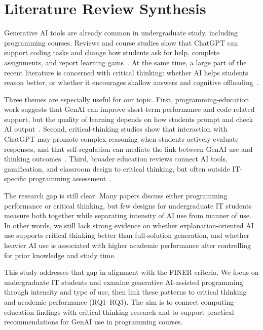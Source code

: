 \documentclass[11pt,a4paper]{article}
\begin{document}
\section{Literature Review Synthesis}

Generative AI tools are already common in undergraduate study, including programming courses. Reviews and course studies show that ChatGPT can support coding tasks and change how students ask for help, complete assignments, and report learning gains~\cite{chatgpt_baig_2026,impact_gambo_2026,explaining_denny_2024}. At the same time, a large part of the recent literature is concerned with critical thinking: whether AI helps students reason better, or whether it encourages shallow answers and cognitive offloading~\cite{critical_larson_2024,ai_gerlich_2025,artificial_zer_2025}.

Three themes are especially useful for our topic. First, programming-education work suggests that GenAI can improve short-term performance and code-related support, but the quality of learning depends on how students prompt and check AI output~\cite{chatgpt_baig_2026,impact_gambo_2026,explaining_denny_2024}. Second, critical-thinking studies show that interaction with ChatGPT may promote complex reasoning when students actively evaluate responses, and that self-regulation can mediate the link between GenAI use and thinking outcomes~\cite{student_suriano_2024,mediating_zhou_2024,prompts_yang_2025}. Third, broader education reviews connect AI tools, gamification, and classroom design to critical thinking, but often outside IT-specific programming assessment~\cite{gamification_kassenkhan_2025,exploring_nasr_2025,collaborative_ruizrojas_2024}.

The research gap is still clear. Many papers discuss either programming performance or critical thinking, but few designs for undergraduate IT students measure both together while separating intensity of AI use from manner of use. In other words, we still lack strong evidence on whether explanation-oriented AI use supports critical thinking better than full-solution generation, and whether heavier AI use is associated with higher academic performance after controlling for prior knowledge and study time.

This study addresses that gap in alignment with the FINER criteria. We focus on undergraduate IT students and examine generative AI-assisted programming through intensity and type of use, then link these patterns to critical thinking and academic performance (RQ1--RQ3). The aim is to connect computing-education findings with critical-thinking research and to support practical recommendations for GenAI use in programming courses.
\end{document}
